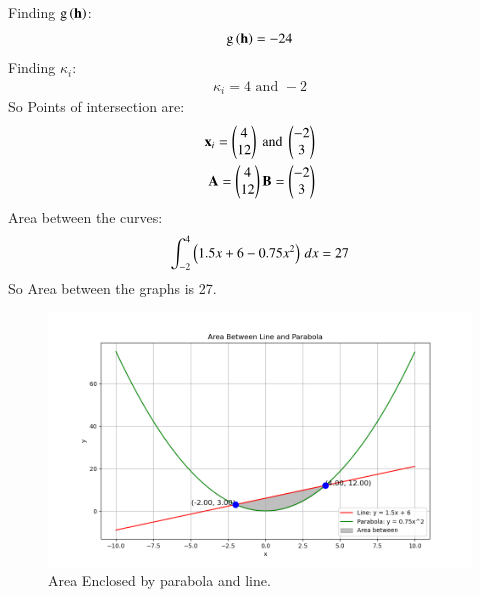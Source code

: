\documentclass[journal]{IEEEtran}
\numberwithin{equation}{enumi}
\numberwithin{figure}{enumi}
\begin{document}
Finding $\text{g}\left(\mathbf{h}\right)$:
\begin{align}
	\text{g}\left(\mathbf{h}\right)=-24
\end{align}
Finding $\kappa_i$:
\begin{align}
	\kappa_i=4 \text{ and } -2
\end{align}
So Points of intersection are:
\begin{align}
	\mathbf{x}_i=\begin{pmatrix}4\\12\end{pmatrix} \text{ and } \begin{pmatrix}-2\\3\end{pmatrix}\\
 \mathbf{A}=\begin{pmatrix}4\\12\end{pmatrix} \mathbf{B}=\begin{pmatrix}-2\\3\end{pmatrix}
\end{align}
Area between the curves:
\begin{align}
     \int_{-2}^{4}\left(1.5x+6-0.75x^2\right)\,dx =27
\end{align}
So Area between the graphs is 27.\\
\begin{figure}[h!]
   \centering
   \includegraphics[width=0.9\linewidth]{Figure_1.png}
	\caption{Area Enclosed by parabola and line. }
   \label{stemplot}
\end{figure}
\end{document}
